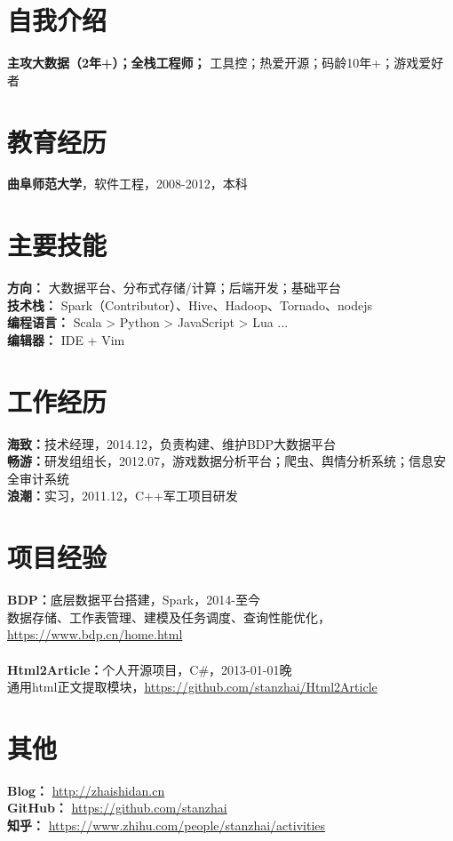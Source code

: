 \documentclass[UTF8,margin,line]{res}
\begin{document}

\begin{resume}

\section{\sc 自我介绍}
\textbf{主攻大数据（2年+）；全栈工程师；} 工具控；热爱开源；码龄10年+；游戏爱好者

\section{\sc 教育经历}
\textbf{曲阜师范大学}，软件工程，2008-2012，本科

\section{\sc 主要技能}
\textbf{方向：} 大数据平台、分布式存储/计算；后端开发；基础平台 \\
\textbf{技术栈：} Spark（Contributor）、Hive、Hadoop、Tornado、nodejs \\
\textbf{编程语言：} Scala > Python > JavaScript > Lua ... \\
\textbf{编辑器：} IDE + Vim

\section{\sc 工作经历}
\textbf{海致：}技术经理，2014.12，负责构建、维护BDP大数据平台 \\
\textbf{畅游：}研发组组长，2012.07，游戏数据分析平台；爬虫、舆情分析系统；信息安全审计系统 \\
\textbf{浪潮：}实习，2011.12，C++军工项目研发

\section{\sc 项目经验}
\textbf{BDP：}底层数据平台搭建，Spark，2014-至今 \\
数据存储、工作表管理、建模及任务调度、查询性能优化， \url{https://www.bdp.cn/home.html} \\
\\
\textbf{Html2Article：}个人开源项目，C\#，2013-01-01晚 \\
通用html正文提取模块，\url{https://github.com/stanzhai/Html2Article} \\

\section{\sc 其他}
\textbf{Blog：} \url{http://zhaishidan.cn} \\
\textbf{GitHub：} \url{https://github.com/stanzhai} \\
\textbf{知乎：} \url{https://www.zhihu.com/people/stanzhai/activities} \\

\end{resume}
\end{document}
